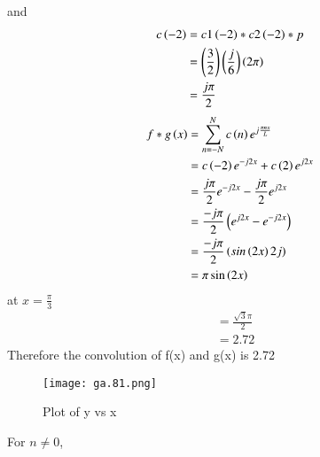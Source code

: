 \documentclass[journal,12pt,onecolumn]{IEEEtran}
\theoremstyle{remark}
\begin{document}
and
\begin{align}
    c\left(-2\right)&=c1\left(-2\right)*c2\left(-2\right)*p\\
    &=\left(\frac{3}{2}\right)\left(\frac{j}{6}\right)\left(2\pi\right)\\
    &=\frac{j\pi}{2}
\end{align}
\begin{align}
   {f*g}\left(x\right)&=\sum_{n=-N}^{N}c\left(n\right) e^{j\frac{\pi nx}{L}}\\
    &=c\left(-2\right)e^{-j2x} + c\left(2\right)e^{j2x}\\
    &=\frac{j\pi}{2}e^{-j2x}-\frac{j\pi}{2}e^{j2x}\\
    &=\frac{-j\pi}{2}\left(e^{j2x}-e^{-j2x}\right)\\
    &=\frac{-j\pi}{2}\left(sin\left(2x\right)2j\right)\\
    &=\pi \sin\left(2x\right)\\
\end{align}
at $x=\frac{\pi}{3}$
\begin{align}
    &=\frac{\sqrt{3}\pi}{2}\\
    &=2.72
\end{align}
Therefore the convolution of f(x) and g(x) is 2.72
\begin{figure}[!h]
    \centering
    \texttt{[image: ga.81.png]}
    \caption{Plot of y vs x}
    \label{fig:1}
\end{figure}
For $n\neq0$,
\end{document}
